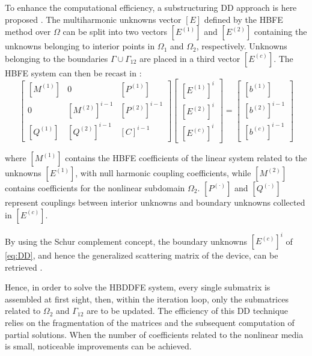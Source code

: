 \documentclass[journal]{IEEEtran}
\begin{document}
To enhance the computational efficiency, a substructuring DD
approach is here proposed \cite{Guarnieri2009, Guarnieri2010}. The multiharmonic
unknowns vector $[E]$ defined by the HBFE method over $\Omega$ can be split
into two vectors $[E^{(1)}]$ and $[E^{(2)}]$ containing the unknowns belonging
to interior points in $\Omega_1$ and $\Omega_2$, respectively. Unknowns
belonging to the boundaries $\Gamma\cup\Gamma_{12}$ are placed in a third
vector $[E^{(c)}]$. The HBFE system can then be recast in :
%
\begin{equation}\label{eq:DD}
\begin{bmatrix}
 [M^{(1)}] &  \!\!0\!\!  &  [P^{(1)}] \\
 0  &  \!\![M^{(2)}]^{i-1}\!\! & [P^{(2)}]^{i-1} \\
 [Q^{(1)}] & \!\![Q^{(2)}]^{i-1}\!\! & [C]^{i-1}
\end{bmatrix}
\!\!\!\!
\begin{bmatrix}
{[E^{(1)}]^{i}} \\
{[E^{(2)}]^{i}} \\
{[E^{(c)}]^{i}}
\end{bmatrix} 
\!\!\!=\!\!\!
\begin{bmatrix}
{[b^{(1)}]} \\
{[b^{(2)}]}^{i-1} \\
{[b^{(c)}]}^{i-1}
\end{bmatrix} 
\end{equation}

\noindent where $[M^{(1)}]$ contains the HBFE coefficients of the linear system
related to the unknowns $[E^{(1)}]$, with
null harmonic coupling coefficients, while $[M^{(2)}]$ contains coefficients for
the nonlinear subdomain $\Omega_2$. ${[P^{(\cdot)}]}$ and ${[Q^{(\cdot)}]}$
represent couplings between interior unknowns and 
boundary unknowns collected in $[E^{(c)}]$. 

By using the Schur complement concept, the boundary unknowns $[E^{(c)}]^{i}$ of
\eqref{eq:DD}, and hence the generalized scattering matrix of the device, can be retrieved 
\cite{Guarnieri2009, Guarnieri2010}.

Hence, in order to solve the HBDDFE system,
every single submatrix is assembled at first sight, then, within the iteration
loop, only the submatrices related to $\Omega_2$ and $\Gamma_{12}$ are to be
updated. The efficiency of this 
DD technique relies on the fragmentation of the
matrices and the subsequent computation of partial solutions. When the number
of coefficients related to the nonlinear media is small, noticeable
improvements can be achieved.
\end{document}
